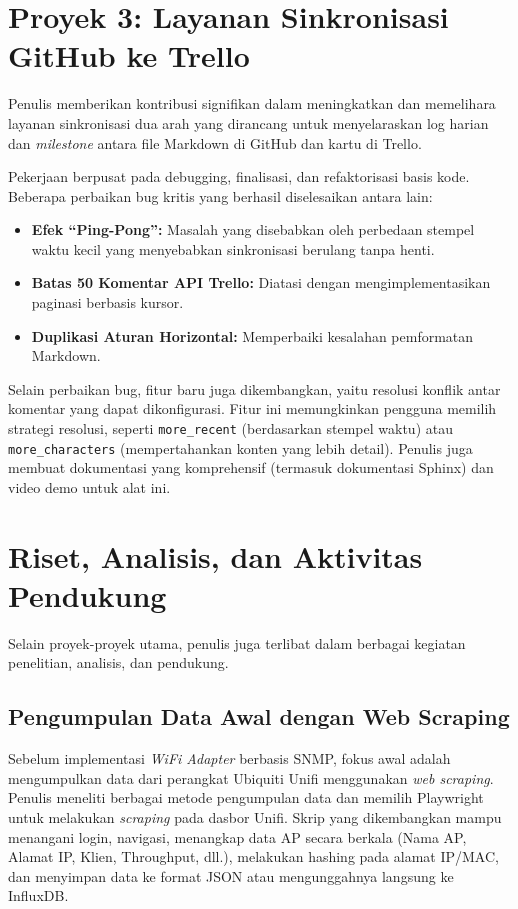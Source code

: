\section{Proyek 3: Layanan Sinkronisasi GitHub ke Trello}
Penulis memberikan kontribusi signifikan dalam meningkatkan dan memelihara layanan sinkronisasi dua arah yang dirancang untuk menyelaraskan log harian dan \textit{milestone} antara file Markdown di GitHub dan kartu di Trello.

Pekerjaan berpusat pada debugging, finalisasi, dan refaktorisasi basis kode. Beberapa perbaikan bug kritis yang berhasil diselesaikan antara lain:
\begin{itemize}
    \item \textbf{Efek ``Ping-Pong'':} Masalah yang disebabkan oleh perbedaan stempel waktu kecil yang menyebabkan sinkronisasi berulang tanpa henti.
    \item \textbf{Batas 50 Komentar API Trello:} Diatasi dengan mengimplementasikan paginasi berbasis kursor.
    \item \textbf{Duplikasi Aturan Horizontal:} Memperbaiki kesalahan pemformatan Markdown.
\end{itemize}
Selain perbaikan bug, fitur baru juga dikembangkan, yaitu resolusi konflik antar komentar yang dapat dikonfigurasi. Fitur ini memungkinkan pengguna memilih strategi resolusi, seperti \texttt{more\_recent} (berdasarkan stempel waktu) atau \texttt{more\_characters} (mempertahankan konten yang lebih detail). Penulis juga membuat dokumentasi yang komprehensif (termasuk dokumentasi Sphinx) dan video demo untuk alat ini.

\section{Riset, Analisis, dan Aktivitas Pendukung}
Selain proyek-proyek utama, penulis juga terlibat dalam berbagai kegiatan penelitian, analisis, dan pendukung.

\subsection{Pengumpulan Data Awal dengan Web Scraping}

Sebelum implementasi \textit{WiFi Adapter} berbasis SNMP, fokus awal adalah mengumpulkan data dari perangkat Ubiquiti Unifi menggunakan \textit{web scraping}. Penulis meneliti berbagai metode pengumpulan data dan memilih Playwright untuk melakukan \textit{scraping} pada dasbor Unifi. Skrip yang dikembangkan mampu menangani login, navigasi, menangkap data AP secara berkala (Nama AP, Alamat IP, Klien, Throughput, dll.), melakukan hashing pada alamat IP/MAC, dan menyimpan data ke format JSON atau mengunggahnya langsung ke InfluxDB.


